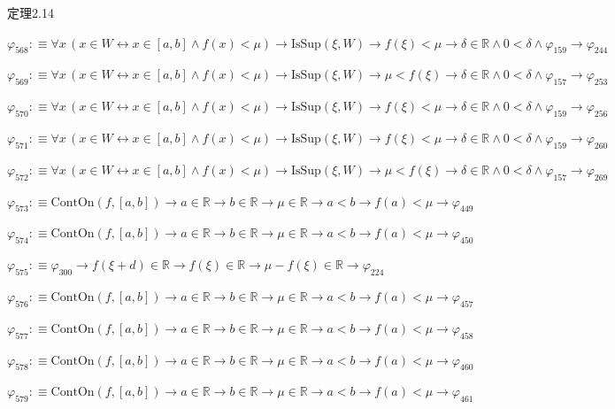 \begin{fullproof}{定理2.14}
\begin{abbrevlist}
\item $\varphi_{568} :\equiv \forall x\,(x \in W \leftrightarrow x \in [a,b] \land f(x) < \mu) \to \mathrm{IsSup}(\xi,W) \to f(\xi) < \mu \to \delta \in \mathbb{R} \land 0 < \delta \land \varphi_{159} \to \varphi_{244}$
\item $\varphi_{569} :\equiv \forall x\,(x \in W \leftrightarrow x \in [a,b] \land f(x) < \mu) \to \mathrm{IsSup}(\xi,W) \to \mu < f(\xi) \to \delta \in \mathbb{R} \land 0 < \delta \land \varphi_{157} \to \varphi_{253}$
\item $\varphi_{570} :\equiv \forall x\,(x \in W \leftrightarrow x \in [a,b] \land f(x) < \mu) \to \mathrm{IsSup}(\xi,W) \to f(\xi) < \mu \to \delta \in \mathbb{R} \land 0 < \delta \land \varphi_{159} \to \varphi_{256}$
\item $\varphi_{571} :\equiv \forall x\,(x \in W \leftrightarrow x \in [a,b] \land f(x) < \mu) \to \mathrm{IsSup}(\xi,W) \to f(\xi) < \mu \to \delta \in \mathbb{R} \land 0 < \delta \land \varphi_{159} \to \varphi_{260}$
\item $\varphi_{572} :\equiv \forall x\,(x \in W \leftrightarrow x \in [a,b] \land f(x) < \mu) \to \mathrm{IsSup}(\xi,W) \to \mu < f(\xi) \to \delta \in \mathbb{R} \land 0 < \delta \land \varphi_{157} \to \varphi_{269}$
\item $\varphi_{573} :\equiv \mathrm{ContOn}(f,[a,b]) \to a \in \mathbb{R} \to b \in \mathbb{R} \to \mu \in \mathbb{R} \to a < b \to f(a) < \mu \to \varphi_{449}$
\item $\varphi_{574} :\equiv \mathrm{ContOn}(f,[a,b]) \to a \in \mathbb{R} \to b \in \mathbb{R} \to \mu \in \mathbb{R} \to a < b \to f(a) < \mu \to \varphi_{450}$
\item $\varphi_{575} :\equiv \varphi_{300} \to f(\xi + d) \in \mathbb{R} \to f(\xi) \in \mathbb{R} \to \mu - f(\xi) \in \mathbb{R} \to \varphi_{224}$
\item $\varphi_{576} :\equiv \mathrm{ContOn}(f,[a,b]) \to a \in \mathbb{R} \to b \in \mathbb{R} \to \mu \in \mathbb{R} \to a < b \to f(a) < \mu \to \varphi_{457}$
\item $\varphi_{577} :\equiv \mathrm{ContOn}(f,[a,b]) \to a \in \mathbb{R} \to b \in \mathbb{R} \to \mu \in \mathbb{R} \to a < b \to f(a) < \mu \to \varphi_{458}$
\item $\varphi_{578} :\equiv \mathrm{ContOn}(f,[a,b]) \to a \in \mathbb{R} \to b \in \mathbb{R} \to \mu \in \mathbb{R} \to a < b \to f(a) < \mu \to \varphi_{460}$
\item $\varphi_{579} :\equiv \mathrm{ContOn}(f,[a,b]) \to a \in \mathbb{R} \to b \in \mathbb{R} \to \mu \in \mathbb{R} \to a < b \to f(a) < \mu \to \varphi_{461}$

\end{abbrevlist}
\end{fullproof}
